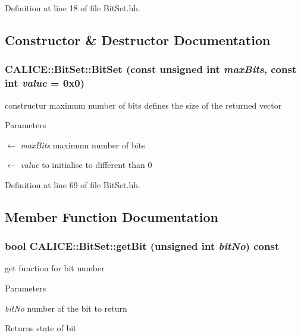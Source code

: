 Definition at line 18 of file BitSet.hh.

\subsection{Constructor \& Destructor Documentation}
\subsubsection[{BitSet}]{\setlength{\rightskip}{0pt plus 5cm}CALICE::BitSet::BitSet (const unsigned int {\em maxBits}, \/  const int {\em value} = {\ttfamily 0x0})\hspace{0.3cm}{\ttfamily  [inline, protected]}}\label{classCALICE_1_1BitSet_a73f400c579b2731fc366faf7fa873aa9}


constructur maximum number of bits defines the size of the returned vector


\begin{DoxyParams}{Parameters}
\item[\mbox{$\leftarrow$} {\em maxBits}]maximum number of bits \item[\mbox{$\leftarrow$} {\em value}]to initialise to different than 0 \end{DoxyParams}


Definition at line 69 of file BitSet.hh.

\subsection{Member Function Documentation}
\subsubsection[{getBit}]{\setlength{\rightskip}{0pt plus 5cm}bool CALICE::BitSet::getBit (unsigned int {\em bitNo}) const\hspace{0.3cm}{\ttfamily  [inline, protected]}}\label{classCALICE_1_1BitSet_a0ffe3a5bdb4f4f5ec069c4330fef672b}


get function for bit number 
\begin{DoxyParams}{Parameters}
\item[{\em bitNo}]number of the bit to return \end{DoxyParams}
\begin{DoxyReturn}{Returns}
state of bit 
\end{DoxyReturn}


